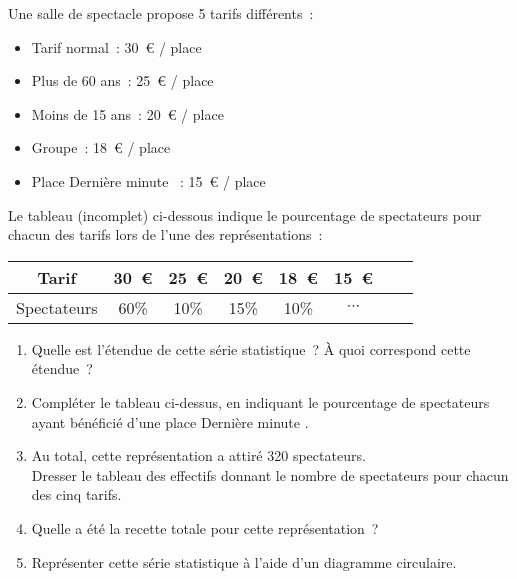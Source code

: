 
%
Une salle de spectacle propose 5 tarifs différents~:
\begin{itemize}
     \item %
     Tarif normal~: 30~€ / place
     \item %
     Plus de 60 ans~: 25~€ / place
     \item %
     Moins de 15 ans~: 20~€ / place
     \item %
     Groupe~: 18~€ / place
     \item %
     Place \og Dernière minute \fg{} ~: 15~€ / place
\end{itemize}
Le tableau (incomplet) ci-dessous indique le pourcentage de spectateurs pour chacun des tarifs lors de l'une des représentations~:
\begin{center}
     \begin{tabular}{|c|c|c|c|c|c|c|c|} %
          \hline
          Tarif   &  30~€  &  25~€ &  20~€  &  18~€  &  15~€
          \\ \hline
          Spectateurs       & 60\%   &  10\%    & 15\%    &  10\%  & $\cdots$
          \\ \hline
     \end{tabular}
\end{center}
\begin{enumerate}
     \item %
     Quelle est l'étendue de cette série statistique~? À quoi correspond cette étendue~?
     \item %
     Compléter le tableau ci-dessus, en indiquant le pourcentage de spectateurs ayant bénéficié d'une place \og Dernière minute  \fg{}.
     \item %
     Au total, cette représentation a attiré 320 spectateurs.\\
     Dresser le tableau des effectifs donnant le nombre de spectateurs pour chacun des cinq tarifs.
     \item %
     Quelle a été la recette totale pour cette représentation~?
     \item %
     Représenter cette série statistique à l'aide d'un diagramme circulaire.
\end{enumerate}
